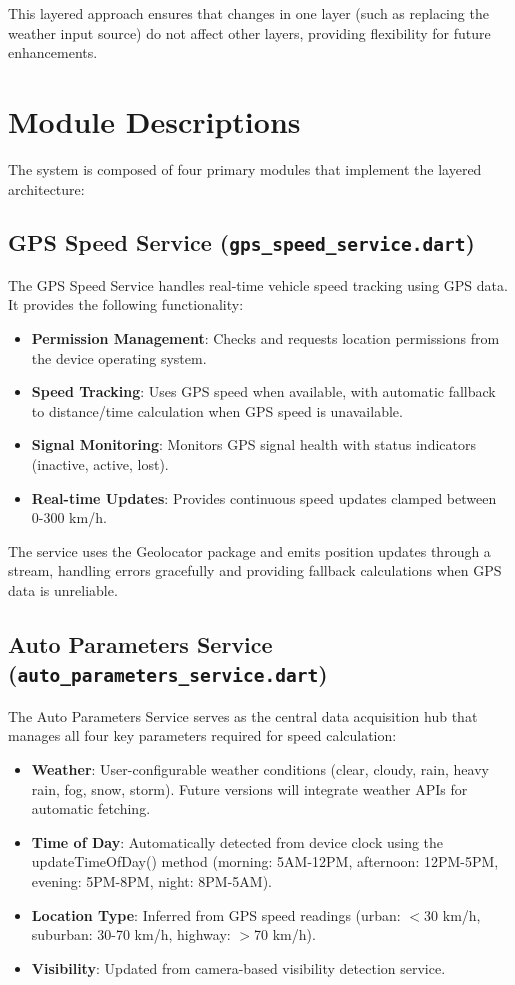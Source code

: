 This layered approach ensures that changes in one layer (such as replacing the weather input source) do not affect other layers, providing flexibility for future enhancements.

\section{Module Descriptions}
The system is composed of four primary modules that implement the layered architecture:

\subsection{GPS Speed Service (\texttt{gps\_speed\_service.dart})}
The GPS Speed Service handles real-time vehicle speed tracking using GPS data. It provides the following functionality:
\begin{itemize}
    \item \textbf{Permission Management}: Checks and requests location permissions from the device operating system.
    \item \textbf{Speed Tracking}: Uses GPS speed when available, with automatic fallback to distance/time calculation when GPS speed is unavailable.
    \item \textbf{Signal Monitoring}: Monitors GPS signal health with status indicators (inactive, active, lost).
    \item \textbf{Real-time Updates}: Provides continuous speed updates clamped between 0-300 km/h.
\end{itemize}

The service uses the Geolocator package and emits position updates through a stream, handling errors gracefully and providing fallback calculations when GPS data is unreliable.

\subsection{Auto Parameters Service (\texttt{auto\_parameters\_service.dart})}
The Auto Parameters Service serves as the central data acquisition hub that manages all four key parameters required for speed calculation:

\begin{itemize}
    \item \textbf{Weather}: User-configurable weather conditions (clear, cloudy, rain, heavy rain, fog, snow, storm). Future versions will integrate weather APIs for automatic fetching.
    \item \textbf{Time of Day}: Automatically detected from device clock using the updateTimeOfDay() method (morning: 5AM-12PM, afternoon: 12PM-5PM, evening: 5PM-8PM, night: 8PM-5AM).
    \item \textbf{Location Type}: Inferred from GPS speed readings (urban: $<$30 km/h, suburban: 30-70 km/h, highway: $>$70 km/h).
    \item \textbf{Visibility}: Updated from camera-based visibility detection service.
\end{itemize}


